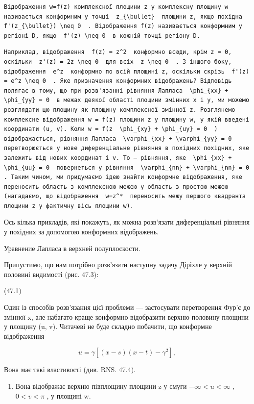 \documentclass[
  ukrainian,
]{article}
\providecommand{\tightlist}{%
  \setlength{\itemsep}{0pt}\setlength{\parskip}{0pt}}
\begin{document}
\begin{verbatim}
Відображення w=f(z) комплексної площини z у комплексну площину w називається конформним у точці  z_{\bullet}  площини z, якщо похідна  f'(z_{\bullet}) \neq 0  . Відображення f(z) називається конформним у регіоні D, якщо  f'(z) \neq 0  в кожній точці регіону D.
\end{verbatim}

\begin{verbatim}
Наприклад, відображення  f(z) = z^2  конформно всюди, крім z = 0, оскільки  z'(z) = 2z \neq 0  для всіх  z \neq 0  . З іншого боку, відображення  e^z  конформно по всій площині z, оскільки скрізь  f'(z) = e^z \neq 0  . Яке призначення конформних відображень? Відповідь полягає в тому, що при розв'язанні рівняння Лапласа  \phi_{xx} + \phi_{yy} = 0  в межах деякої області площини змінних x і y, ми можемо розглядати цю площину як площину комплексної змінної z. Розглянемо комплексне відображення w = f(z) площини z у площину w, у якій введені координати (u, v). Коли w = f(z  \phi_{xy} + \phi_{uy} = 0  ) відображається, рівняння Лапласа  \varphi_{xx} + \varphi_{yy} = 0  перетворюється у нове диференціальне рівняння в похідних похідних, яке залежить від нових координат і v. To — рівняння, яке  \phi_{xx} + \phi_{uu} = 0  повернеться у рівняння  \varphi_{nn} + \varphi_{nn} = 0  . Таким чином, ми придумаємо ідею знайти конформне відображення, яке переносить область з комплексною межею у область з простою межею (нагадаємо, що відображення  w=z^*  переносить межу першого квадранта площини z у фактичну вісь площини w).
\end{verbatim}

Ось кілька прикладів, які покажуть, як можна розв'язати диференціальні
рівняння у похідних за допомогою конформних відображень.

Уравнение Лапласа в верхней полуплоскости.

Припустимо, що нам потрібно розв'язати наступну задачу Діріхле у верхній
половині видимості (рис. 47.3):

(47.1)

Один із способів розв'язання цієї проблеми --- застосувати перетворення
Фур'є до змінної x, але набагато краще конформно відобразити верхню
половину площини у площину (u, v). Читачеві не буде складно побачити, що
конформне відображення

\[
u = \gamma [(x-s)(x-t)-\gamma^2],
\]

Вона має такі властивості (див. RNS. 47.4).

\begin{enumerate}
\def\labelenumi{\arabic{enumi}.}
\tightlist
\item
  Вона відображає верхню півплощину площини z у смуги
  \(-\infty < u < \infty\) , \(0 < v < \pi\) , у площині w.
\end{enumerate}
\end{document}
